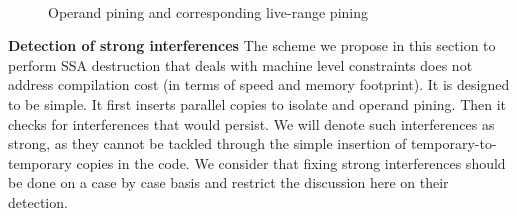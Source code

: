 \begin{figure}[h]
\hfill
{}
\\
\hfill
{}
\caption{\label{fig:alternative_ssa_destruction:pining}Operand pining and corresponding live-range pining}
\end{figure}


{\bf Detection of strong interferences}
The scheme we propose in this section to perform SSA destruction that deals with machine level constraints does not address compilation cost (in terms of speed and memory footprint). It is designed to be simple. It first inserts parallel copies to isolate \phifuns and operand pining. Then it checks for interferences that would persist. We will denote such interferences as strong, as they cannot be tackled through the simple insertion of temporary-to-temporary copies in the code. We consider that fixing strong interferences should be done on a case by case basis and restrict the discussion here on their detection.

